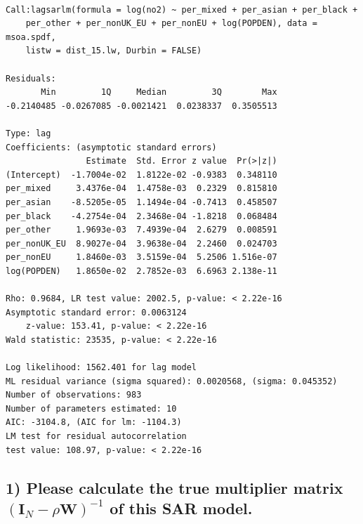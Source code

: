 \documentclass[
  letterpaper,
  DIV=11,
  numbers=noendperiod]{scrreprt}
\begin{document}
\begin{verbatim}

Call:lagsarlm(formula = log(no2) ~ per_mixed + per_asian + per_black + 
    per_other + per_nonUK_EU + per_nonEU + log(POPDEN), data = msoa.spdf, 
    listw = dist_15.lw, Durbin = FALSE)

Residuals:
       Min         1Q     Median         3Q        Max 
-0.2140485 -0.0267085 -0.0021421  0.0238337  0.3505513 

Type: lag 
Coefficients: (asymptotic standard errors) 
                Estimate  Std. Error z value  Pr(>|z|)
(Intercept)  -1.7004e-02  1.8122e-02 -0.9383  0.348110
per_mixed     3.4376e-04  1.4758e-03  0.2329  0.815810
per_asian    -8.5205e-05  1.1494e-04 -0.7413  0.458507
per_black    -4.2754e-04  2.3468e-04 -1.8218  0.068484
per_other     1.9693e-03  7.4939e-04  2.6279  0.008591
per_nonUK_EU  8.9027e-04  3.9638e-04  2.2460  0.024703
per_nonEU     1.8460e-03  3.5159e-04  5.2506 1.516e-07
log(POPDEN)   1.8650e-02  2.7852e-03  6.6963 2.138e-11

Rho: 0.9684, LR test value: 2002.5, p-value: < 2.22e-16
Asymptotic standard error: 0.0063124
    z-value: 153.41, p-value: < 2.22e-16
Wald statistic: 23535, p-value: < 2.22e-16

Log likelihood: 1562.401 for lag model
ML residual variance (sigma squared): 0.0020568, (sigma: 0.045352)
Number of observations: 983 
Number of parameters estimated: 10 
AIC: -3104.8, (AIC for lm: -1104.3)
LM test for residual autocorrelation
test value: 108.97, p-value: < 2.22e-16
\end{verbatim}

\hypertarget{please-calculate-the-true-multiplier-matrix-boldsymbolmathbfi_n-rho-boldsymbolmathbfw-1-of-this-sar-model.}{%
\subsection*{\texorpdfstring{1) Please calculate the true multiplier
matrix
\(({\boldsymbol{\mathbf{I}}_N}-\rho {\boldsymbol{\mathbf{W}}})^{-1}\) of
this SAR
model.}{1) Please calculate the true multiplier matrix (\{\textbackslash boldsymbol\{\textbackslash mathbf\{I\}\}\_N\}-\textbackslash rho \{\textbackslash boldsymbol\{\textbackslash mathbf\{W\}\}\})\^{}\{-1\} of this SAR model.}}\label{please-calculate-the-true-multiplier-matrix-boldsymbolmathbfi_n-rho-boldsymbolmathbfw-1-of-this-sar-model.}}
\end{document}
